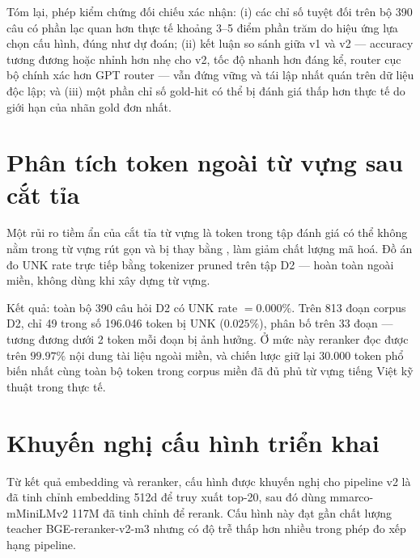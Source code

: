\documentclass[../DoAn.tex]{subfiles}
\begin{document}
Tóm lại, phép kiểm chứng đối chiếu xác nhận: (i) các chỉ số tuyệt đối trên bộ 390 câu có phần lạc quan hơn thực tế khoảng 3--5 điểm phần trăm do hiệu ứng lựa chọn cấu hình, đúng như dự đoán; (ii) kết luận so sánh giữa v1 và v2 --- accuracy tương đương hoặc nhỉnh hơn nhẹ cho v2, tốc độ nhanh hơn đáng kể, router cục bộ chính xác hơn GPT router --- vẫn đứng vững và tái lập nhất quán trên dữ liệu độc lập; và (iii) một phần chỉ số gold-hit có thể bị đánh giá thấp hơn thực tế do giới hạn của nhãn gold đơn nhất.


\section{Phân tích token ngoài từ vựng sau cắt tỉa}
\label{section:unk-analysis}

Một rủi ro tiềm ẩn của cắt tỉa từ vựng là token trong tập đánh giá có thể không nằm trong từ vựng rút gọn và bị thay bằng \plaincode{[UNK]}, làm giảm chất lượng mã hoá. Đồ án đo UNK rate trực tiếp bằng tokenizer pruned trên tập D2 --- hoàn toàn ngoài miền, không dùng khi xây dựng từ vựng.

Kết quả: toàn bộ 390 câu hỏi D2 có UNK rate $= 0.000\%$. Trên 813 đoạn corpus D2, chỉ 49 trong số 196.046 token bị UNK ($0.025\%$), phân bố trên 33 đoạn --- tương đương dưới 2 token mỗi đoạn bị ảnh hưởng. Ở mức này reranker đọc được trên $99.97\%$ nội dung tài liệu ngoài miền, và chiến lược giữ lại 30.000 token phổ biến nhất cùng toàn bộ token trong corpus miền đã đủ phủ từ vựng tiếng Việt kỹ thuật trong thực tế.

\section{Khuyến nghị cấu hình triển khai}
\label{section:4.5}

Từ kết quả embedding và reranker, cấu hình được khuyến nghị cho pipeline v2 là đã tinh chỉnh embedding 512d để truy xuất top-20, sau đó dùng mmarco-mMiniLMv2 117M đã tinh chỉnh để rerank. Cấu hình này đạt gần chất lượng teacher BGE-reranker-v2-m3 nhưng có độ trễ thấp hơn nhiều trong phép đo xếp hạng pipeline.
\end{document}
